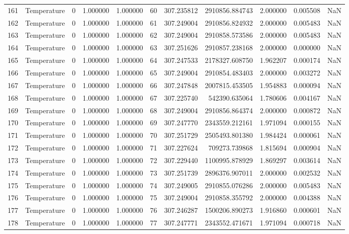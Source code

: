 \begin{tabular}{llrrrrrrrrr}
161 & Temperature & 0 & 1.000000 & 1.000000 & 60 & 307.235812 & 2910856.884743 & 2.000000 & 0.005508 & NaN \\
162 & Temperature & 0 & 1.000000 & 1.000000 & 61 & 307.249004 & 2910856.824932 & 2.000000 & 0.005483 & NaN \\
163 & Temperature & 0 & 1.000000 & 1.000000 & 62 & 307.249004 & 2910858.573586 & 2.000000 & 0.005483 & NaN \\
164 & Temperature & 0 & 1.000000 & 1.000000 & 63 & 307.251626 & 2910857.238168 & 2.000000 & 0.000000 & NaN \\
165 & Temperature & 0 & 1.000000 & 1.000000 & 64 & 307.247533 & 2178327.608750 & 1.962207 & 0.000174 & NaN \\
166 & Temperature & 0 & 1.000000 & 1.000000 & 65 & 307.249004 & 2910854.483403 & 2.000000 & 0.003272 & NaN \\
167 & Temperature & 0 & 1.000000 & 1.000000 & 66 & 307.247848 & 2007815.453505 & 1.954883 & 0.000094 & NaN \\
168 & Temperature & 0 & 1.000000 & 1.000000 & 67 & 307.225740 & 542390.635064 & 1.780606 & 0.004167 & NaN \\
169 & Temperature & 0 & 1.000000 & 1.000000 & 68 & 307.249004 & 2910856.864374 & 2.000000 & 0.000872 & NaN \\
170 & Temperature & 0 & 1.000000 & 1.000000 & 69 & 307.247770 & 2343559.212161 & 1.971094 & 0.000155 & NaN \\
171 & Temperature & 0 & 1.000000 & 1.000000 & 70 & 307.251729 & 2505493.801380 & 1.984424 & 0.000061 & NaN \\
172 & Temperature & 0 & 1.000000 & 1.000000 & 71 & 307.227624 & 709273.739868 & 1.815694 & 0.000904 & NaN \\
173 & Temperature & 0 & 1.000000 & 1.000000 & 72 & 307.229440 & 1100995.878929 & 1.869297 & 0.003614 & NaN \\
174 & Temperature & 0 & 1.000000 & 1.000000 & 73 & 307.251739 & 2896376.907011 & 2.000000 & 0.002532 & NaN \\
175 & Temperature & 0 & 1.000000 & 1.000000 & 74 & 307.249005 & 2910855.076286 & 2.000000 & 0.005483 & NaN \\
176 & Temperature & 0 & 1.000000 & 1.000000 & 75 & 307.249004 & 2910858.355792 & 2.000000 & 0.004388 & NaN \\
177 & Temperature & 0 & 1.000000 & 1.000000 & 76 & 307.246287 & 1500206.890273 & 1.916860 & 0.000601 & NaN \\
178 & Temperature & 0 & 1.000000 & 1.000000 & 77 & 307.247771 & 2343552.471671 & 1.971094 & 0.000718 & NaN \\

\end{tabular}

